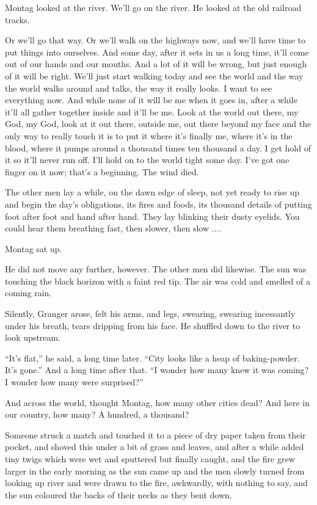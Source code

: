 \documentclass[11pt,openany]{book}
\begin{document}
Montag looked at the river. We'll go on the river. He looked at the old railroad tracks.

Or we'll go that way. Or we'll walk on the highways now, and we'll have time to put things into ourselves. And some day, after it sets in us a long time, it'll come out of our hands and our mouths. And a lot of it will be wrong, but just enough of it will be right. We'll just start walking today and see the world and the way the world walks around and talks, the way it really looks. I want to see everything now. And while none of it will be me when it goes in, after a while it'll all gather together inside and it'll be me. Look at the world out there, my God, my God, look at it out there, outside me, out there beyond my face and the only way to really touch it is to put it where it's finally me, where it's in the blood, where it pumps around a thousand times ten thousand a day. I get hold of it so it'll never run off. I'll hold on to the world tight some day. I've got one finger on it now; that's a beginning. The wind died.

The other men lay a while, on the dawn edge of sleep, not yet ready to rise up and begin the day's obligations, its fires and foods, its thousand details of putting foot after foot and hand after hand. They lay blinking their dusty eyelids. You could hear them breathing fast, then slower, then slow ....

Montag sat up.

He did not move any further, however. The other men did likewise. The sun was touching the black horizon with a faint red tip. The air was cold and smelled of a coming rain.

Silently, Granger arose, felt his arms, and legs, swearing, swearing incessantly under his breath, tears dripping from his face. He shuffled down to the river to look upstream.

``It's flat,'' he said, a long time later. ``City looks like a heap of baking-powder. It's gone.'' And a long time after that. ``I wonder how many knew it was coming? I wonder how many were surprised?''

And across the world, thought Montag, how many other cities dead? And here in our country, how many? A hundred, a thousand?

Someone struck a match and touched it to a piece of dry paper taken from their pocket, and shoved this under a bit of grass and leaves, and after a while added tiny twigs which were wet and sputtered but finally caught, and the fire grew larger in the early morning as the sun came up and the men slowly turned from looking up river and were drawn to the fire, awkwardly, with nothing to say, and the sun coloured the backs of their necks as they bent down.
\end{document}
